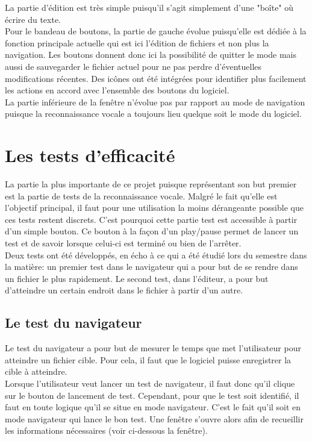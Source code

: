 \documentclass[a4paper, 11pt]{report}
\begin{document}
	
	La partie d'édition est très simple puisqu'il s'agit simplement d'une "boîte" où écrire du texte.\\
	Pour le bandeau de boutons, la partie de gauche évolue puisqu'elle est dédiée à la fonction principale actuelle qui est ici l'édition de fichiers et non plus la navigation. Les boutons donnent donc ici la possibilité de quitter le mode mais aussi de sauvegarder le fichier actuel pour ne pas perdre d'éventuelles modifications récentes. Des icônes ont été intégrées pour identifier plus facilement les actions en accord avec l'ensemble des boutons du logiciel.\\
	La partie inférieure de la fenêtre n'évolue pas par rapport au mode de navigation puisque la reconnaissance vocale a toujours lieu quelque soit le mode du logiciel.
	
	\chapter{Les tests d'efficacité}
	
	La partie la plus importante de ce projet puisque représentant son but premier est la partie de tests de la reconnaissance vocale. Malgré le fait qu'elle est l'objectif principal, il faut pour une utilisation la moins dérangeante possible que ces tests restent discrets. C'est pourquoi cette partie test est accessible à partir d'un simple bouton. Ce bouton à la façon d'un play/pause permet de lancer un test et de savoir lorsque celui-ci est terminé ou bien de l'arrêter.\\
	Deux tests ont été développés, en écho à ce qui a été étudié lors du semestre dans la matière: un premier test dans le navigateur qui a pour but de se rendre dans un fichier le plus rapidement. Le second test, dans l'éditeur, a pour but d'atteindre un certain endroit dans le fichier à partir d'un autre.
	
		\section{Le test du navigateur}
		
		Le test du navigateur a pour but de mesurer le temps que met l'utilisateur pour atteindre un fichier cible. Pour cela, il faut que le logiciel puisse enregistrer la cible à atteindre.\\
		Lorsque l'utilisateur veut lancer un test de navigateur, il faut donc qu'il clique sur le bouton de lancement de test. Cependant, pour que le test soit identifié, il faut en toute logique qu'il se situe en mode navigateur. C'est le fait qu'il soit en mode navigateur qui lance le bon test. Une fenêtre s'ouvre alors afin de recueillir les informations nécessaires (voir ci-dessous la fenêtre).\\
		
\end{document}

